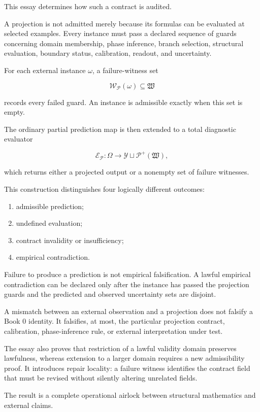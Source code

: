 \documentclass[11pt,oneside,openany]{book}
\begin{document}
This essay determines how such a contract is audited.

A projection is not admitted merely because its formulas can be evaluated at selected examples. Every instance must pass a declared sequence of guards concerning domain membership, phase inference, branch selection, structural evaluation, boundary status, calibration, readout, and uncertainty.

For each external instance \(\omega\), a failure-witness set

\[
\mathcal W_{\mathcal P}(\omega) \subseteq \mathfrak W
\]

records every failed guard. An instance is admissible exactly when this set is empty.

The ordinary partial prediction map is then extended to a total diagnostic evaluator

\[
\mathcal E_{\mathcal P}: \Omega \longrightarrow \mathcal Y\sqcup\mathcal P^{+}(\mathfrak W),
\]

which returns either a projected output or a nonempty set of failure witnesses.

This construction distinguishes four logically different outcomes:

\begin{enumerate}
\item admissible prediction;
\item undefined evaluation;
\item contract invalidity or insufficiency;
\item empirical contradiction.
\end{enumerate}
Failure to produce a prediction is not empirical falsification. A lawful empirical contradiction can be declared only after the instance has passed the projection guards and the predicted and observed uncertainty sets are disjoint.

A mismatch between an external observation and a projection does not falsify a Book 0 identity. It falsifies, at most, the particular projection contract, calibration, phase-inference rule, or external interpretation under test.

The essay also proves that restriction of a lawful validity domain preserves lawfulness, whereas extension to a larger domain requires a new admissibility proof. It introduces repair locality: a failure witness identifies the contract field that must be revised without silently altering unrelated fields.

The result is a complete operational airlock between structural mathematics and external claims.
\end{document}
